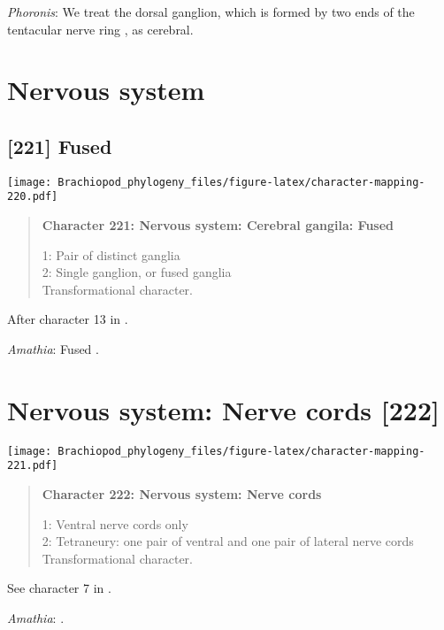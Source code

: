 \documentclass[openany]{book}
\theoremstyle{definition}
\theoremstyle{definition}
\theoremstyle{definition}
\theoremstyle{remark}
\begin{document}
\hypertarget{Phoronis-coding-220}{}
\emph{Phoronis}: We treat the dorsal ganglion, which is formed by two
ends of the tentacular nerve ring \citep{Temereva2016Phoronida}, as
cerebral.

\section{Nervous system}\label{nervous-system-1}

\subsection*{{[}221{]} Fused}\label{fused}

\texttt{[image: Brachiopod\_phylogeny\_files/figure-latex/character-mapping-220.pdf]}

\begin{quote}
\textbf{Character 221: Nervous system: Cerebral gangila: Fused}

1: Pair of distinct ganglia\\
2: Single ganglion, or fused ganglia\\
Transformational character.
\end{quote}

After character 13 in \citet{Haszprunar1996}.

\hypertarget{Amathia-coding-221}{}
\emph{Amathia}: Fused \citep{Temereva2016Thenervous}.

\section{Nervous system: Nerve cords
{[}222{]}}\label{nervous-system-nerve-cords-222}

\texttt{[image: Brachiopod\_phylogeny\_files/figure-latex/character-mapping-221.pdf]}

\begin{quote}
\textbf{Character 222: Nervous system: Nerve cords}

1: Ventral nerve cords only\\
2: Tetraneury: one pair of ventral and one pair of lateral nerve cords\\
Transformational character.
\end{quote}

See character 7 in \citet{Haszprunar2008}.

\hypertarget{Amathia-coding-222}{}
\emph{Amathia}: \citet{Temereva2016Thenervous}.
\end{document}
